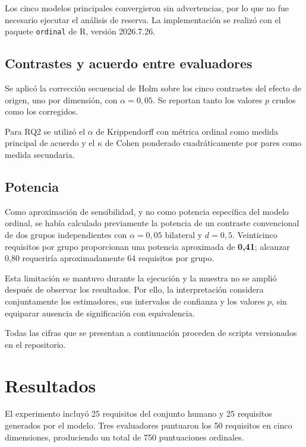 \documentclass[runningheads]{llncs}
\begin{document}
Los cinco modelos principales convergieron sin advertencias, por lo que no fue
necesario ejecutar el an\'alisis de reserva. La implementaci\'on se realiz\'o con
el paquete \texttt{ordinal} de R, versi\'on 2026.7.26.

\subsection{Contrastes y acuerdo entre evaluadores}

Se aplic\'o la correcci\'on secuencial de Holm \cite{holm1979} sobre los cinco
contrastes del efecto de origen, uno por dimensi\'on, con $\alpha=0{,}05$. Se
reportan tanto los valores $p$ crudos como los corregidos.

Para RQ2 se utiliz\'o el $\alpha$ de Krippendorff con m\'etrica ordinal
\cite{hayes2007} como medida principal de acuerdo y el $\kappa$ de Cohen ponderado
cuadr\'aticamente \cite{cohen1968} por pares como medida secundaria.

\subsection{Potencia}

Como aproximaci\'on de sensibilidad, y no como potencia espec\'ifica del modelo
ordinal, se hab\'ia calculado previamente la potencia de un contraste convencional
de dos grupos independientes con $\alpha=0{,}05$ bilateral y $d=0{,}5$.
Veinticinco requisitos por grupo proporcionan una potencia aproximada de
\textbf{0,41}; alcanzar 0,80 requerir\'ia aproximadamente 64 requisitos por grupo.

Esta limitaci\'on se mantuvo durante la ejecuci\'on y la muestra no se ampli\'o
despu\'es de observar los resultados. Por ello, la interpretaci\'on considera
conjuntamente los estimadores, sus intervalos de confianza y los valores $p$, sin
equiparar ausencia de significaci\'on con equivalencia.

Todas las cifras que se presentan a continuaci\'on proceden de scripts
versionados en el repositorio.

\section{Resultados}
\label{sec:resultados}

El experimento incluy\'o 25 requisitos del conjunto humano y 25 requisitos
generados por el modelo. Tres evaluadores puntuaron los 50 requisitos en cinco
dimensiones, produciendo un total de 750 puntuaciones ordinales.
\end{document}
